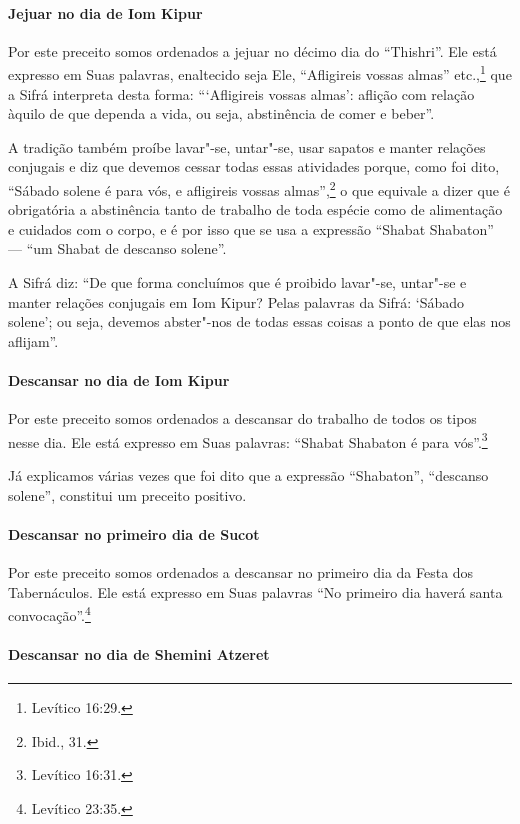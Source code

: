 \begin{multicols}{2}
\paragraph{Jejuar no dia de Iom Kipur\starr}

Por este preceito somos ordenados a jejuar no décimo dia do
``Thishri''. Ele está expresso em Suas palavras, enaltecido seja Ele,
``Afligireis vossas almas'' etc.,\footnote{Levítico 16:29.} que a Sifrá\starr{}
interpreta desta forma: ```Afligireis vossas almas': aflição com relação àquilo de que dependa a vida, ou seja, abstinência de comer e beber''.

A tradição também proíbe lavar"-se, untar"-se, usar sapatos e manter
relações conjugais e diz que devemos cessar todas essas atividades
porque, como foi dito, ``Sábado solene é para vós, e afligireis vossas
almas'',\footnote{Ibid., 31.} o que equivale a dizer que é obrigatória a
abstinência tanto de trabalho de toda espécie como de alimentação e
cuidados com o corpo, e é por isso que se usa a expressão ``Shabat
Shabaton'' --- ``um Shabat de descanso solene''.

A Sifrá\starr{} diz: ``De que forma concluímos que é proibido lavar"-se, untar"-se
e manter relações conjugais em Iom Kipur\starr? Pelas palavras da Sifrá\starr:
`Sábado solene'; ou seja, devemos abster"-nos de todas essas coisas a
ponto de que elas nos aflijam''.

\paragraph{Descansar no dia de Iom Kipur\starr}

Por este preceito somos ordenados a descansar do trabalho de todos os
tipos nesse dia. Ele está expresso em Suas palavras: ``Shabat Shabaton é
para vós''.\footnote{Levítico 16:31.}

Já explicamos várias vezes que foi dito que a expressão ``Shabaton'',
``descanso solene'', constitui um preceito positivo.

\paragraph{Descansar no primeiro dia de Sucot\starr}

Por este preceito somos ordenados a descansar no primeiro dia da Festa
dos Tabernáculos. Ele está expresso em Suas palavras ``No primeiro dia
haverá santa convocação''.\footnote{Levítico 23:35.}

\paragraph{Descansar no dia de Shemini Atzeret\starr}


\end{multicols}
